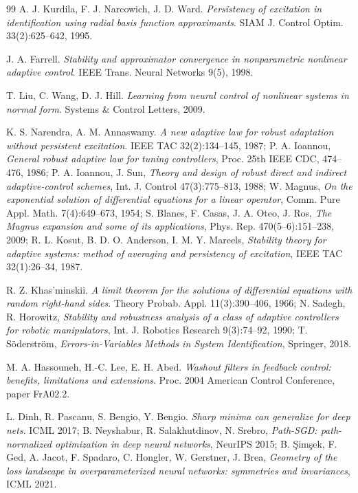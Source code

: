 \begin{thebibliography}{99}
A. J. Kurdila, F. J. Narcowich, J. D. Ward.
\emph{Persistency of excitation in identification using radial basis function approximants}.
SIAM J. Control Optim. 33(2):625--642, 1995.

J. A. Farrell.
\emph{Stability and approximator convergence in nonparametric nonlinear adaptive control}.
IEEE Trans. Neural Networks 9(5), 1998.

T. Liu, C. Wang, D. J. Hill.
\emph{Learning from neural control of nonlinear systems in normal form}.
Systems \& Control Letters, 2009.

K. S. Narendra, A. M. Annaswamy.
\emph{A new adaptive law for robust adaptation without persistent excitation}.
IEEE TAC 32(2):134--145, 1987;
P. A. Ioannou, \emph{General robust adaptive law for tuning controllers}, Proc. 25th IEEE CDC, 474--476, 1986;
P. A. Ioannou, J. Sun, \emph{Theory and design of robust direct and indirect adaptive-control schemes},
Int. J. Control 47(3):775--813, 1988;
W. Magnus, \emph{On the exponential solution of differential equations for a linear operator}, Comm. Pure Appl. Math.
7(4):649--673, 1954;
S. Blanes, F. Casas, J. A. Oteo, J. Ros, \emph{The Magnus expansion and some of its applications}, Phys. Rep.
470(5--6):151--238, 2009;
R. L. Kosut, B. D. O. Anderson, I. M. Y. Mareels, \emph{Stability theory for adaptive systems: method of averaging and
persistency of excitation}, IEEE TAC 32(1):26--34, 1987.

R. Z. Khas'minskii.
\emph{A limit theorem for the solutions of differential equations with random right-hand sides}.
Theory Probab. Appl. 11(3):390--406, 1966;
N. Sadegh, R. Horowitz, \emph{Stability and robustness analysis of a class of adaptive controllers for robotic
manipulators}, Int. J. Robotics Research 9(3):74--92, 1990;
T. S\"oderstr\"om, \emph{Errors-in-Variables Methods in System Identification}, Springer, 2018.

M. A. Hassouneh, H.-C. Lee, E. H. Abed.
\emph{Washout filters in feedback control: benefits, limitations and extensions}.
Proc. 2004 American Control Conference, paper FrA02.2.

L. Dinh, R. Pascanu, S. Bengio, Y. Bengio.
\emph{Sharp minima can generalize for deep nets}.
ICML 2017;
B. Neyshabur, R. Salakhutdinov, N. Srebro, \emph{Path-SGD: path-normalized optimization in deep neural networks},
NeurIPS 2015;
B. \c{S}im\c{s}ek, F. Ged, A. Jacot, F. Spadaro, C. Hongler, W. Gerstner, J. Brea,
\emph{Geometry of the loss landscape in overparameterized neural networks: symmetries and invariances}, ICML 2021.


\end{thebibliography}
